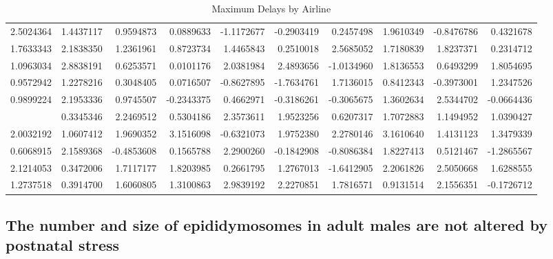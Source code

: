 \documentclass[12pt,twoside]{reedthesis}
\begin{document}
\begin{longtable}[t]{rrrrrrrrrr}
\caption[Max Delays by Airline]{\label{tab:tab1}Maximum Delays by Airline}\\
\toprule
2.5024364 & 1.4437117 & 0.9594873 & 0.0889633 & -1.1172677 & -0.2903419 & 0.2457498 & 1.9610349 & -0.8476786 & 0.4321678\\
1.7633343 & 2.1838350 & 1.2361961 & 0.8723734 & 1.4465843 & 0.2510018 & 2.5685052 & 1.7180839 & 1.8237371 & 0.2314712\\
1.0963034 & 2.8838191 & 0.6253571 & 0.0101176 & 2.0381984 & 2.4893656 & -1.0134960 & 1.8136553 & 0.6493299 & 1.8054695\\
0.9572942 & 1.2278216 & 0.3048405 & 0.0716507 & -0.8627895 & -1.7634761 & 1.7136015 & 0.8412343 & -0.3973001 & 1.2347526\\
0.9899224 & 2.1953336 & 0.9745507 & -0.2343375 & 0.4662971 & -0.3186261 & -0.3065675 & 1.3602634 & 2.5344702 & -0.0664436\\
\addlinespace
-0.2564516 & 0.3345346 & 2.2469512 & 0.5304186 & 2.3573611 & 1.9523256 & 0.6207317 & 1.7072883 & 1.1494952 & 1.0390427\\
2.0032192 & 1.0607412 & 1.9690352 & 3.1516098 & -0.6321073 & 1.9752380 & 2.2780146 & 3.1610640 & 1.4131123 & 1.3479339\\
0.6068915 & 2.1589368 & -0.4853608 & 0.1565788 & 2.2900260 & -0.1842908 & -0.8086384 & 1.8227413 & 0.5121467 & -1.2865567\\
2.1214053 & 0.3472006 & 1.7117177 & 1.8203985 & 0.2661795 & 1.2767013 & -1.6412905 & 2.2061826 & 2.5050668 & 1.6288555\\
1.2737518 & 0.3914700 & 1.6060805 & 1.3100863 & 2.9839192 & 2.2270851 & 1.7816571 & 0.9131514 & 2.1556351 & -0.1726712\\
\bottomrule
\end{longtable}
\hypertarget{the-number-and-size-of-epididymosomes-in-adult-males-are-not-altered-by-postnatal-stress}{%
\subsection{The number and size of epididymosomes in adult males are not altered by postnatal stress}\label{the-number-and-size-of-epididymosomes-in-adult-males-are-not-altered-by-postnatal-stress}}
\end{document}
